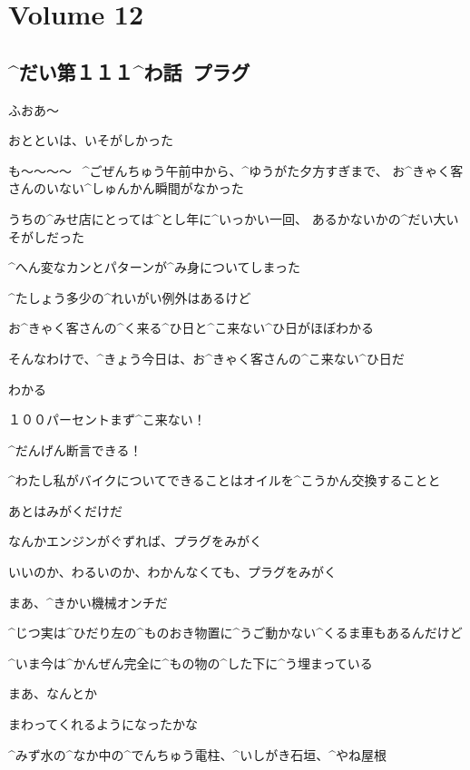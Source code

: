 \section{Volume 12}

\subsection{^{だい}{第}１１１^{わ}{話}\ プラグ}

\page[4]
\Alpha ふおあ〜

\Alpha おとといは、いそがしかった

\page[5]
\Alpha も〜〜〜〜
\ ^{ごぜんちゅう}{午前中}から、^{ゆうがた}{夕方}すぎまで、
お^{きゃく}{客}さんのいない^{しゅんかん}{瞬間}がなかった

\Alpha うちの^{みせ}{店}にとっては^{とし}{年}に^{いっかい}{一回}、
あるかないかの^{だい}{大}いそがしだった

\Alpha ^{へん}{変}なカンとパターンが^{み}{身}についてしまった

\Alpha ^{たしょう}{多少}の^{れいがい}{例外}はあるけど

\Alpha お^{きゃく}{客}さんの^{く}{来}る^{ひ}{日}と^{こ}{来}ない^{ひ}{日}がほぼわかる

\page[6]
\Alpha そんなわけで、^{きょう}{今日}は、お^{きゃく}{客}さんの^{こ}{来}ない^{ひ}{日}だ

\Alpha わかる

\Alpha １００パーセントまず^{こ}{来}ない！

\Alpha ^{だんげん}{断言}できる！

\page[7]
\Alpha ^{わたし}{私}がバイクについてできることはオイルを^{こうかん}{交換}することと

\Alpha あとはみがくだけだ

\Alpha なんかエンジンがぐずれば、プラグをみがく

\Alpha いいのか、わるいのか、わかんなくても、プラグをみがく

\Alpha まあ、^{きかい}{機械}オンチだ

\Alpha ^{じつ}{実}は^{ひだり}{左}の^{ものおき}{物置}に^{うご}{動}かない^{くるま}{車}もあるんだけど

\Alpha ^{いま}{今}は^{かんぜん}{完全}に^{もの}{物}の^{した}{下}に^{う}{埋}まっている

\page[10]
\Alpha まあ、なんとか

\Alpha まわってくれるようになったかな

\page[11]
\Alpha ^{みず}{水}の^{なか}{中}の^{でんちゅう}{電柱}、^{いしがき}{石垣}、^{やね}{屋根}


